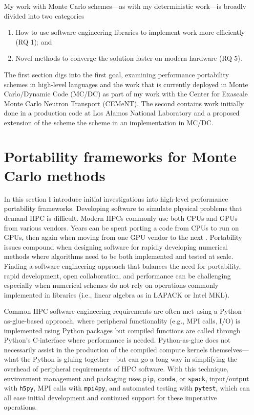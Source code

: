 My work with Monte Carlo schemes---as with my deterministic work---is broadly divided into two categories
\begin{enumerate}
    \item How to use software engineering libraries to implement work more efficiently (RQ 1); and
    \item Novel methods to converge the solution faster on modern hardware (RQ 5).
\end{enumerate}
The first section digs into the first goal, examining performance portability schemes in high-level languages and the work that is currently deployed in Monte Carlo/Dynamic Code (MC/DC) as part of my work with the Center for Exascale Monte Carlo Neutron Transport (CEMeNT).
The second contains work initially done in a production code at Los Alamos National Laboratory and a proposed extension of the scheme the scheme in an implementation in MC/DC.

\section{Portability frameworks for Monte Carlo methods}

In this section I introduce initial investigations into high-level performance portability frameworks.
Developing software to simulate physical problems that demand HPC is difficult.
Modern HPCs commonly use both CPUs and GPUs from various vendors.
Years can be spent porting a code from CPUs to run on GPUs, then again when moving from one GPU vendor to the next \cite{pozulp_progress_2023}.
Portability issues compound when designing software for rapidly developing numerical methods where algorithms need to be both implemented and tested at scale.
Finding a software engineering approach that balances the need for portability, rapid development, open collaboration, and performance can be challenging especially when numerical schemes do not rely on operations commonly implemented in libraries   (i.e., linear algebra as in LAPACK or Intel MKL). 

Common HPC software engineering requirements are often met using a Python-as-glue-based approach, where peripheral functionality (e.g., MPI calls, I/O) is implemented using Python packages but compiled functions are called through Python's C-interface where performance is needed.
Python-as-glue does not necessarily assist in the production of the compiled compute kernels themselves---what the Python is gluing together---but can go a long way in simplifying the overhead of peripheral requirements of HPC software.
With this technique, environment management and packaging uses \texttt{pip}, \texttt{conda}, or \texttt{spack}, input/output with \texttt{h5py}, MPI calls with \texttt{mpi4py}, 
and automated testing with \texttt{pytest}, which can all ease initial development and continued support for these imperative operations. 

